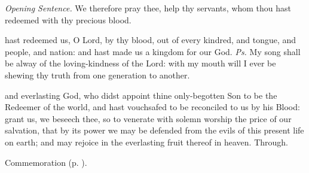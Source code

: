 \par\noindent
\textit{Opening Sentence.} We therefore pray thee, help thy servants, whom thou hast redeemed with thy precious blood.

\vspace{-0.2\baselineskip}

\introit

\vspace{-0.1\baselineskip}

 hast redeemed us, O Lord, by thy blood, out of every kindred, and tongue, and people, and nation: and hast made us a kingdom for our God. \textit{Ps.} My song shall be alway of the loving-kindness of the Lord: with my mouth will I ever be shewing thy truth from one generation to another.

\vspace{-0.05\baselineskip}

\collect

\vspace{-0.05\baselineskip}

 and everlasting God, who didst appoint thine only-begotten Son to be the Redeemer of the world, and hast vouchsafed to be reconciled to us by his Blood: grant us, we beseech thee, so to venerate with solemn worship the price of our salvation, that by its power we may be defended from the evils of this present life on earth; and may rejoice in the everlasting fruit thereof in heaven. Through.
\begin{rubric}
    Commemoration  (p. \pageref{JohnCollect}).
\end{rubric}

